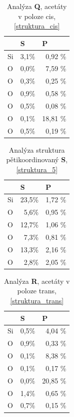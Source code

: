 \documentclass[
  digital, %
  table,   %
  lof,     %
  lot,     %
  oneside,
]{fithesis3}
\begin{document}
\begin{table}[htbp]
\caption{Analýza \textbf{Q}, acetáty v poloze cis, \ref{struktura_cis}}
\begin{center}
\begin{tabular}{|l|r|r|}
\hline
 & \multicolumn{1}{l|}{S} & \multicolumn{1}{l|}{P} \\ \hline
Si & 3,1\% & 0,92 \% \\ \hline
O & 0,0\% & 7,59 \% \\ \hline
O & 0,3\% & 0,25 \% \\ \hline
O & 0,9\% & 0,58 \% \\ \hline
O & 0,5\% & 0,08 \% \\ \hline
O & 0,1\% & 18,81 \% \\ \hline
O & 0,5\% & 0,19 \% \\ \hline
\end{tabular}
\end{center}
\label{struktura_C_cis_MPA}
\end{table}

\begin{table}[htbp]
\caption{Analýza struktura pětikoordinovaný \textbf{S}, \ref{struktura_5}}
\begin{center}
\begin{tabular}{|l|r|r|}
\hline
 & \multicolumn{1}{l|}{S} & \multicolumn{1}{l|}{P} \\ \hline
 Si & 23,5\% & 1,72 \% \\ \hline
 O & 5,6\% & 0,95 \% \\ \hline
 O & 12,7\% & 1,06 \% \\ \hline
 O & 7,3\% & 0,81 \% \\ \hline
 O & 13,3\% & 2,16 \% \\ \hline
 O & 2,8\% & 2,05 \% \\ \hline
\end{tabular}
\end{center}
\label{struktura_5_MPA}
\end{table}

\begin{table}[htbp]
\caption{Analýza \textbf{R}, acetáty v poloze trans, \ref{struktura_trans}}
\begin{center}
\begin{tabular}{|l|r|r|}
\hline
 & \multicolumn{1}{l|}{S} & \multicolumn{1}{l|}{P} \\ \hline
Si & 0,5\% & 4,04 \% \\ \hline
O & 0,9\% & 0,33 \% \\ \hline
O & 0,1\% & 8,38 \% \\ \hline
O & 0,1\% & 0,17 \% \\ \hline
O & 0,0\% & 20,85 \% \\ \hline
O & 1,4\% & 0,65 \% \\ \hline
O & 0,7\% & 0,15 \% \\ \hline
\end{tabular}
\end{center}
\label{struktura_C_trans_MPA}
\end{table}
\end{document}
